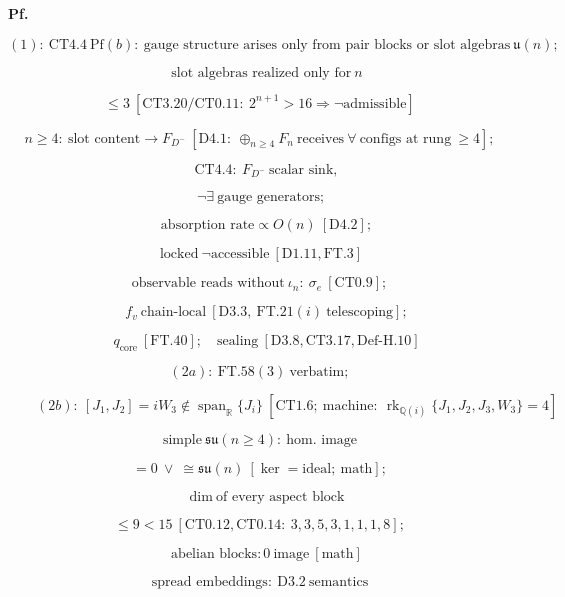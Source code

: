 \documentclass[11pt,openany]{report}
\theoremstyle{canonplain}
\theoremstyle{canondef}
\begin{document}
\textbf{Pf.}

\[
(1):\ \mathrm{CT4.4\ Pf}(b):\ \text{gauge structure arises only from pair blocks or slot algebras}\ \mathfrak u(n);
\]

\[
\quad\text{slot algebras realized only for}\ n
\]

\[
\le 3\ [\mathrm{CT3.20}/\mathrm{CT0.11}:\ 2^{n+1}>16\Rightarrow\neg\text{admissible}]
\]

\[
n \ge 4:\ \text{slot content}\to F_{D^-}\ [\mathrm{D4.1}:\ \oplus_{n\ge4}F_n\ \text{receives}\ \forall\ \text{configs at rung}\ \ge4];
\]

\[
\quad\mathrm{CT4.4}:\ F_{D^-}\ \text{scalar sink},
\]

\[
\ \neg\exists\ \text{gauge generators};
\]

\[
\quad\text{absorption rate}\propto O(n)\ [\mathrm{D4.2}];
\]

\[
\ \text{locked}\ \neg\text{accessible}\ [\mathrm{D1.11},\mathrm{FT.3}]
\]

\[
\text{observable reads without}\ \iota_n:\ \sigma_e\ [\mathrm{CT0.9}];
\]

\[
\quad f_v\ \text{chain-local}\ [\mathrm{D3.3},\ \mathrm{FT.21}(i)\ \text{telescoping}];
\]

\[
\quad q_{\mathrm{core}}\ [\mathrm{FT.40}];\quad\text{sealing}\ [\mathrm{D3.8},\mathrm{CT3.17},\mathrm{Def\text{-}H.10}]
\]

\[
(2a):\ \mathrm{FT.58}(3)\ \text{verbatim};
\]

\[
\qquad (2b):\ [J_1,J_2]=iW_3\notin\operatorname{span}_{\mathbb R}\{J_i\}\ [\mathrm{CT1.6};\ \text{machine}:\ \operatorname{rk}_{\mathbb Q(i)}\{J_1,J_2,J_3,W_3\}=4]
\]

\[
\text{simple}\ \mathfrak{su}(n\ge4):\ \text{hom. image}
\]

\[
= 0\ \vee\ \cong\mathfrak{su}(n)\ [\ker=\text{ideal};\ \text{math}];
\]

\[
\quad\dim\ \text{of every aspect block}
\]

\[
\le 9<15\ [\mathrm{CT0.12},\mathrm{CT0.14}:\ 3,3,5,3,1,1,1,8];
\]

\[
\quad\text{abelian blocks}: 0\ \text{image}\ [\text{math}]
\]

\[
\text{spread embeddings}:\ \mathrm{D3.2}\ \text{semantics}
\]
\end{document}
